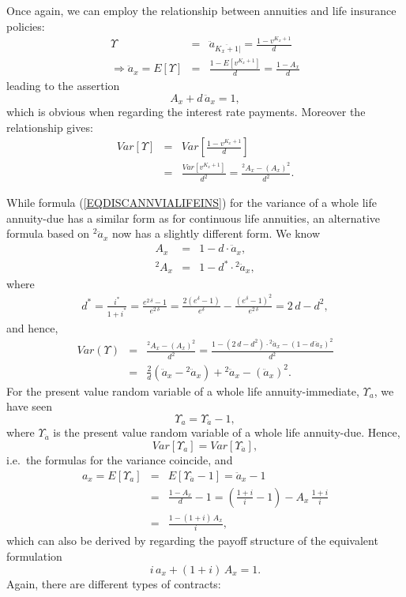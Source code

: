 \documentclass[11pt,fleqn,oneside]{book}
\begin{document}
Once again, we can employ the relationship between annuities and life insurance policies:
\begin{eqnarray*}
\Upsilon &=& \ddot{a}_{\overline{K_x+1}|} = \frac{1 - v^{K_x+1}}{d} \\
\Rightarrow \ddot{a}_x = E[\Upsilon] &=& \frac{1 - E[v^{K_x+1}]}{d} = \frac{1 - A_x}{d}
\end{eqnarray*}
leading to the assertion
$$
A_x + d\, \ddot{a}_x = 1,
$$
which is obvious when regarding the interest rate payments. Moreover the relationship gives:
\begin{eqnarray}
Var[\Upsilon] &=& Var\left[\frac{1 - v^{K_x+1}}{d}\right] \nonumber \\
&=& \frac{Var\left[v^{K_x+1}\right]}{d^2} \nonumber = \frac{{^2A_x} - \left(A_x\right)^2}{d^2}. \label{EQDISCANNVIALIFEINS}
\end{eqnarray}

While formula (\ref{EQDISCANNVIALIFEINS}) for the variance of a whole life annuity-due has a similar form as for continuous life annuities, an alternative formula based on $^2\ddot{a}_x$ now has a slightly different form. We know
\begin{eqnarray*}
A_x &=& 1 - d\cdot \ddot{a}_x,\\
{^2A_x} &=& 1 - d^* \cdot {^2\ddot{a}_x},
\end{eqnarray*}
where
\begin{eqnarray*}
d^* = \frac{i^*}{1+i^*} = \frac{e^{2\,\delta}-1}{e^{2\,\delta}} = \frac{2\left(e^{\delta} - 1 \right)}{e^{\delta}} - \frac{\left(e^{\delta}-1\right)^2}{e^{2\,\delta}} = 2\,d - d^2,
\end{eqnarray*}
and hence,
\begin{eqnarray*}
Var(\Upsilon) &=& \frac{{^2A_x} - \left(A_x\right)^2}{d^2} = \frac{1-(2\,d-d^2)\cdot {^2\ddot{a}_x}- \left(1-d\,\ddot{a}_x\right)^2}{d^2}\\
&=& \frac{2}{d} \left(\ddot{a}_x - {^2\ddot{a}_x}\right) + {^2\ddot{a}_x} - \left(\ddot{a}_x\right)^2.
\end{eqnarray*}
For the present value random variable of a whole life annuity-immediate, $\Upsilon_{a}$, we have seen
$$
\Upsilon_{a} = \Upsilon_{\ddot{a}} - 1,
$$
where $\Upsilon_{\ddot{a}}$ is the present value random variable of a whole life annuity-due. Hence,
$$
Var[\Upsilon_{a}] = Var[\Upsilon_{\ddot{a}}],
$$
i.e.\ the formulas for the variance coincide, and 
\begin{eqnarray*}
a_x = E[\Upsilon_{a}] &=& E[\Upsilon_{\ddot{a}} -1] = \ddot{a}_x - 1\\
&=& \frac{1-A_x}{d} - 1 = \left(\frac{1+i}{i} - 1\right) - A_x\,\frac{1+i}{i}\\
&=& \frac{1 - (1+i)\,A_x}{i},
\end{eqnarray*}
which can also be derived by regarding the payoff structure of the equivalent formulation 
$$
i\,a_x + (1+i)\,A_x = 1.
$$
Again, there are different types of contracts:
\end{document}

